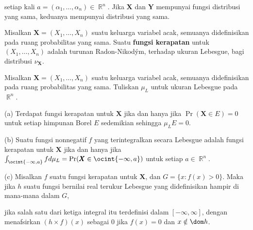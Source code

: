 \noindent setiap kali $a=(\alpha_1,\ldots,\alpha_n)\in\BbbR^n$. Jika
$\pmb{X}$ dan $\pmb{Y}$ mempunyai fungsi distribusi yang sama, keduanya
mempunyai distribusi yang sama.

 Misalkan $\pmb{X}=(X_1,\ldots,X_n)$ suatu keluarga
variabel acak, semuanya didefinisikan pada ruang probabilitas yang sama. Suatu
{\bf fungsi kerapatan} untuk $(X_1,\ldots,X_n)$ adalah turunan
Radon-Nikod\'ym, terhadap ukuran Lebesgue, bagi distribusi
$\nu_{\pmb{X}}$.

 Misalkan $\pmb{X}=(X_1,\ldots,X_n)$ suatu keluarga
variabel acak, semuanya didefinisikan pada ruang probabilitas yang sama.
Tuliskan $\mu_L$ untuk ukuran Lebesgue pada $\BbbR^n$.

(a) Terdapat fungsi kerapatan untuk $\pmb{X}$ jika dan hanya jika
$\Pr(\pmb{X}\in E)=0$ untuk setiap himpunan Borel $E$ sedemikian sehingga
$\mu_LE=0$.

(b) Suatu fungsi nonnegatif $f$ yang terintegralkan secara Lebesgue adalah
fungsi kerapatan untuk $\pmb{X}$ jika dan hanya jika
$\int_{\ocint{-\infty,a}}fd\mu_L=\Pr(\pmb{X}\in\ocint{-\infty,a})$ untuk
setiap $a\in\BbbR^n$.

(c) Misalkan $f$ suatu fungsi kerapatan untuk $\pmb{X}$, dan
$G=\{x:f(x)>0\}$.
Maka jika $h$ suatu fungsi bernilai real terukur Lebesgue yang didefinisikan
hampir di mana-mana dalam $G$,


\noindent jika salah satu dari ketiga integral itu terdefinisi dalam
$[-\infty,\infty]$, dengan menafsirkan $(h\times f)(x)$ sebagai $0$ jika
$f(x)=0$ dan $x\notin\dom h$.

